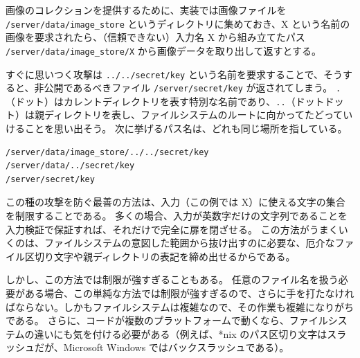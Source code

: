 \documentclass[uplatex]{jsarticle}
\def\label#1{}%
\begin{document}
\begin{exa}[画像ストアに対するパストラバーサル]\label{exa:ch10-image-store-traversal}
画像のコレクションを提供するために、実装では画像ファイルを \verb|/server/data/image_store| というディレクトリに集めておき、X という名前の画像を要求されたら、（信頼できない）入力名 X から組み立てたパス \verb|/server/data/image_store/X| から画像データを取り出して返すとする。

すぐに思いつく攻撃は \verb|../../secret/key| という名前を要求することで、そうすると、非公開であるべきファイル \verb|/server/secret/key| が返されてしまう。
\texttt{.}（ドット）はカレントディレクトリを表す特別な名前であり、\texttt{..}（ドットドット）は親ディレクトリを表し、ファイルシステムのルートに向かってたどっていけることを思い出そう。
次に挙げるパス名は、どれも同じ場所を指している。
\begin{verbatim}
/server/data/image_store/../../secret/key
/server/data/../secret/key
/server/secret/key
\end{verbatim}
\end{exa}

この種の攻撃を防ぐ最善の方法は、入力（この例では X）に使える文字の集合を制限することである。
多くの場合、入力が英数字だけの文字列であることを入力検証で保証すれば、それだけで完全に扉を閉ざせる。
この方法がうまくいくのは、ファイルシステムの意図した範囲から抜け出すのに必要な、厄介なファイル区切り文字や親ディレクトリの表記を締め出せるからである。

しかし、この方法では制限が強すぎることもある。
任意のファイル名を扱う必要がある場合、この単純な方法では制限が強すぎるので、さらに手を打たなければならない。しかもファイルシステムは複雑なので、その作業も複雑になりがちである。
さらに、コードが複数のプラットフォームで動くなら、ファイルシステムの違いにも気を付ける必要がある（例えば、*nix のパス区切り文字はスラッシュだが、Microsoft Windows ではバックスラッシュである）。
\end{document}
